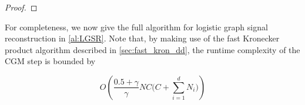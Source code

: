 \begin{proof}



\end{proof}

For completeness, we now give the full algorithm for logistic graph signal reconstruction in \cref{al:LGSR}. Note that, by making use of the fast Kronecker product algorithm described in \cref{sec:fast_kron_dd}, the runtime complexity of the CGM step is bounded by 

\begin{equation*}
    O\left(\frac{0.5 + \gamma}{\gamma} NC \Big(C + \sum_{i=1}^d N_i \Big)\right)
\end{equation*}

